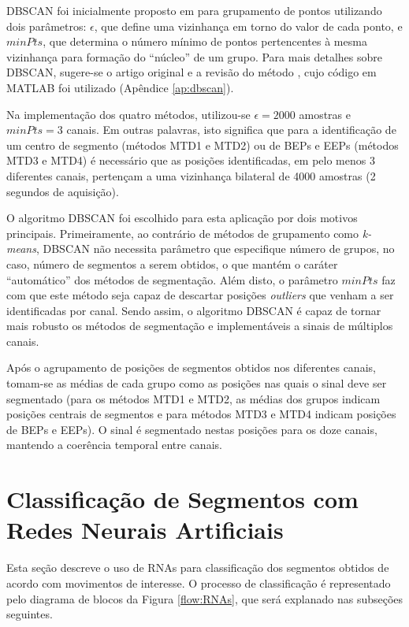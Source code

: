 DBSCAN foi inicialmente proposto em \cite{Ester1996} para grupamento de pontos utilizando dois parâmetros: $\epsilon$, que define uma vizinhança em torno do valor de cada ponto, e $minPts$, que determina o número mínimo de pontos pertencentes à mesma vizinhança para formação do ``núcleo'' de um grupo. Para mais detalhes sobre DBSCAN, sugere-se o artigo original \cite{Ester1996} e a revisão do método \cite{Thanh2013}, cujo código em MATLAB foi utilizado (Apêndice \ref{ap:dbscan}). 

Na implementação dos quatro métodos, utilizou-se $\epsilon = 2000$ amostras e $minPts = 3$ canais. Em outras palavras, isto significa que para a identificação de um centro de segmento (métodos MTD1 e MTD2) ou de BEPs e EEPs (métodos MTD3 e MTD4) é necessário que as posições identificadas, em pelo menos 3 diferentes canais, pertençam a uma vizinhança bilateral de 4000 amostras (2 segundos de aquisição).

O algoritmo DBSCAN foi escolhido para esta aplicação por dois motivos principais. Primeiramente, ao contrário de métodos de grupamento como \emph{k-means}, DBSCAN não necessita parâmetro que especifique número de grupos, no caso, número de segmentos a serem obtidos, o que mantém o caráter ``automático'' dos métodos de segmentação. Além disto, o parâmetro $minPts$ faz com que este método seja capaz de descartar posições \emph{outliers} que venham a ser identificadas por canal. Sendo assim, o algoritmo DBSCAN é capaz de tornar mais robusto os métodos de segmentação e implementáveis a sinais de múltiplos canais.

Após o agrupamento de posições de segmentos obtidos nos diferentes canais, tomam-se as médias de cada grupo como as posições nas quais o sinal deve ser segmentado (para os métodos MTD1 e MTD2, as médias dos grupos indicam posições centrais de segmentos e para métodos MTD3 e MTD4 indicam posições de BEPs e EEPs). O sinal é segmentado nestas posições para os doze canais, mantendo a coerência temporal entre canais.

		\section{Classificação de Segmentos com Redes Neurais Artificiais}
Esta seção descreve o uso de RNAs para classificação dos segmentos obtidos de acordo com movimentos de interesse. O processo de classificação é representado pelo diagrama de blocos da Figura \ref{flow:RNAs}, que será explanado nas subseções seguintes.

